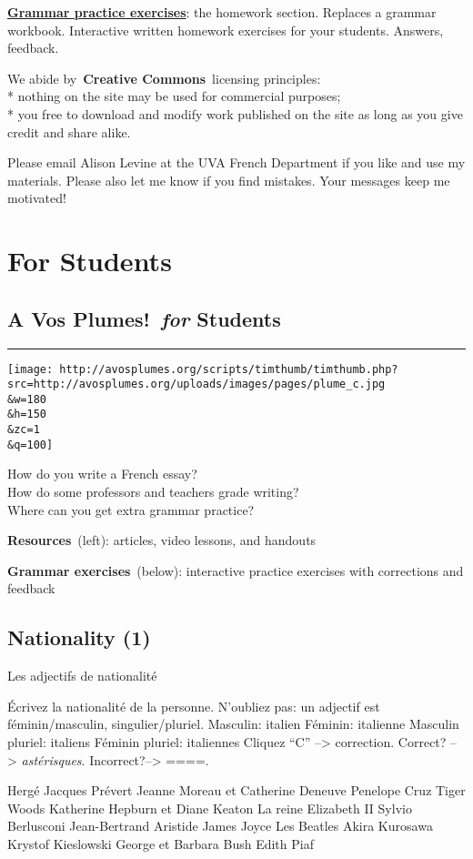 \documentclass[
  letterpaper,
  DIV=11,
  numbers=noendperiod]{scrreprt}
\begin{document}
\href{http://avosplumes.org/students/}{\textbf{Grammar practice
exercises}}: the homework section. Replaces a grammar workbook.
Interactive written homework exercises for your students. Answers,
feedback.

We abide by~\textbf{Creative Commons}~licensing principles:\\
* nothing on the site may be used for commercial purposes;\\
* you free to download and modify work published on the site as long as
you give credit and share alike.

Please email Alison Levine at the UVA French Department if you like and
use my materials. Please also let me know if you find mistakes. Your
messages keep me motivated!

\part{For Students}

\hypertarget{a-vos-plumes-for-students}{%
\chapter{\texorpdfstring{A Vos Plumes!~\emph{for}
Students}{A Vos Plumes!~for Students}}\label{a-vos-plumes-for-students}}

\begin{center}\rule{0.5\linewidth}{0.5pt}\end{center}

\texttt{[image: http://avosplumes.org/scripts/timthumb/timthumb.php?src=http://avosplumes.org/uploads/images/pages/plume\_c.jpg\\\&w=180\\\&h=150\\\&zc=1\\\&q=100]}

How do you write a French essay?\\
How do some professors and teachers grade writing?\\
Where can you get extra grammar practice?

\textbf{Resources}~(left): articles, video lessons, and handouts

\textbf{Grammar exercises}~(below): interactive practice exercises with
corrections and feedback

\hypertarget{nationality-1}{%
\chapter{Nationality (1)}\label{nationality-1}}

Les adjectifs de nationalité

Écrivez la nationalité de la personne. N'oubliez pas: un adjectif est
féminin/masculin, singulier/pluriel. Masculin: italien Féminin:
italienne Masculin pluriel: italiens Féminin pluriel: italiennes Cliquez
``C'' --\textgreater{} correction. Correct? --\textgreater{}
\emph{astérisques}. Incorrect?--\textgreater{} ====.

Hergé Jacques Prévert Jeanne Moreau et Catherine Deneuve Penelope Cruz
Tiger Woods Katherine Hepburn et Diane Keaton La reine Elizabeth II
Sylvio Berlusconi Jean-Bertrand Aristide James Joyce Les Beatles Akira
Kurosawa Krystof Kieslowski George et Barbara Bush Edith Piaf
\end{document}
